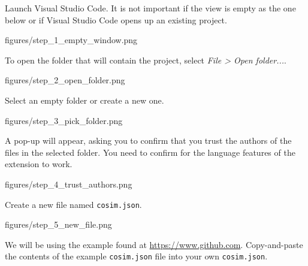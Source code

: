 \documentclass[11pt,a4paper]{../tutorial}
\begin{document}
\begin{instructions} 

\item Launch Visual Studio Code. It is not important if the view is empty as the one below or if Visual Studio Code opens up an existing project.
	
	\begin{annotation}[width=0.85\linewidth]{figures/step_1_empty_window.png}
	\end{annotation}

\item To open the folder that will contain the project, select \textit{File \textgreater{} Open folder...}.
	
	\begin{annotation}[width=0.85\linewidth]{figures/step_2_open_folder.png}
	\end{annotation}

\item Select an empty folder or create a new one.
	
	\begin{annotation}[width=0.85\linewidth]{figures/step_3_pick_folder.png}
	\end{annotation}

\newpage
\item A pop-up will appear, asking you to confirm that you trust the authors of the files in the selected folder. You need to confirm for the language features of the extension to work.
	
	\begin{annotation}[width=0.85\linewidth]{figures/step_4_trust_authors.png}
	\end{annotation}

\item Create a new file named \texttt{cosim.json}.
	
	\begin{annotation}[width=0.85\linewidth]{figures/step_5_new_file.png}
	\end{annotation}

\item We will be using the example found at \url{https://www.github.com}. Copy-and-paste the contents of the example \texttt{cosim.json} file into your own \texttt{cosim.json}.


\end{instructions}
\end{document}

